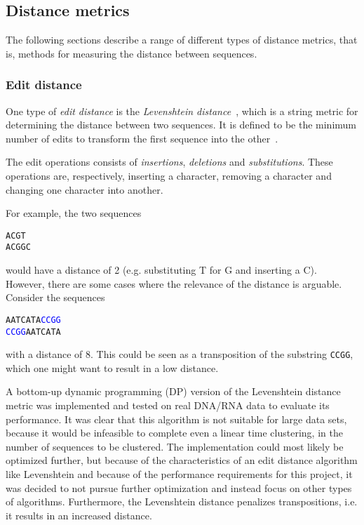 \subsection{Distance metrics}

The following sections describe a range of different types of distance metrics,
that is, methods for measuring the distance between sequences.

\subsubsection{Edit distance}\label{sec:edit_distance}

One type of \emph{edit distance} is the \emph{Levenshtein
distance}~\cite{levenshtein}, which is a string metric for determining the
distance between two sequences. It is defined to be the minimum number of
edits to transform the first sequence into the other~\cite[p.~52]{dong}.

The edit operations consists of \emph{insertions}, \emph{deletions} and
\emph{substitutions}. These operations are, respectively, inserting a character,
removing a character and changing one character into another.

For example, the two sequences
\begin{center}
  \texttt{ACGT} \\
  \texttt{ACGGC}
\end{center}
would have a distance of \num{2} (e.g. substituting T for G and inserting a C).
However, there are some cases where the relevance of the distance is arguable.
Consider the sequences
\begin{center}
  \texttt{AATCATA\textcolor{blue}{CCGG}} \\
  \texttt{\textcolor{blue}{CCGG}AATCATA}
\end{center}
with a distance of \num{8}. This could be seen as a transposition of the
substring \texttt{CCGG}, which one might want to result in a low distance.

A bottom-up dynamic programming (DP) version of the Levenshtein distance
metric was implemented and tested on real DNA/RNA data to evaluate its
performance. It was clear that this algorithm is not suitable for large data
sets, because it would be infeasible to complete even a linear time
clustering, in the number of sequences to be clustered. The implementation
could most likely be optimized further, but because of the characteristics of
an edit distance algorithm like Levenshtein and because of the performance
requirements for this project, it was decided to not pursue further
optimization and instead focus on other types of algorithms. Furthermore, the
Levenshtein distance penalizes transpositions, i.e. it results in an increased
distance.

